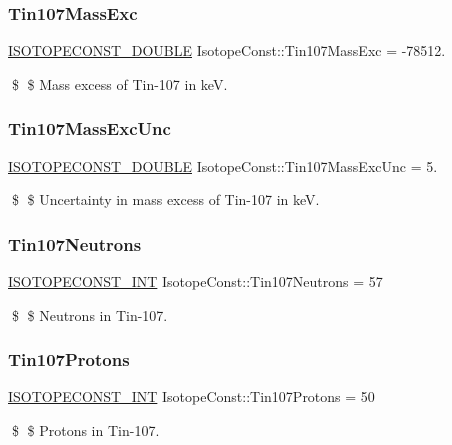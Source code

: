 \subsubsection{\texorpdfstring{Tin107\+Mass\+Exc}{Tin107MassExc}}
{\footnotesize\ttfamily \mbox{\hyperlink{group___isotope_const-_macros_ga8f45a7272ce02c0b4c65c44636ed719a}{I\+S\+O\+T\+O\+P\+E\+C\+O\+N\+S\+T\+\_\+\+D\+O\+U\+B\+LE}} Isotope\+Const\+::\+Tin107\+Mass\+Exc = -\/78512.}

\$ \$ Mass excess of Tin-\/107 in keV. \mbox{\label{group___isotope_const-_tin-_sn107_gac07a70139d8d4c63b59efaa94c54064f}} 
\subsubsection{\texorpdfstring{Tin107\+Mass\+Exc\+Unc}{Tin107MassExcUnc}}
{\footnotesize\ttfamily \mbox{\hyperlink{group___isotope_const-_macros_ga8f45a7272ce02c0b4c65c44636ed719a}{I\+S\+O\+T\+O\+P\+E\+C\+O\+N\+S\+T\+\_\+\+D\+O\+U\+B\+LE}} Isotope\+Const\+::\+Tin107\+Mass\+Exc\+Unc = 5.}

\$ \$ Uncertainty in mass excess of Tin-\/107 in keV. \mbox{\label{group___isotope_const-_tin-_sn107_gab466beefb624da1df0fbb3c6efcacd7e}} 
\subsubsection{\texorpdfstring{Tin107\+Neutrons}{Tin107Neutrons}}
{\footnotesize\ttfamily \mbox{\hyperlink{group___isotope_const-_macros_ga5f18360b3e99483a35c32d789e62621c}{I\+S\+O\+T\+O\+P\+E\+C\+O\+N\+S\+T\+\_\+\+I\+NT}} Isotope\+Const\+::\+Tin107\+Neutrons = 57}

\$ \$ Neutrons in Tin-\/107. \mbox{\label{group___isotope_const-_tin-_sn107_ga5e86fb7b47fc6566acba588b3c5f9159}} 
\subsubsection{\texorpdfstring{Tin107\+Protons}{Tin107Protons}}
{\footnotesize\ttfamily \mbox{\hyperlink{group___isotope_const-_macros_ga5f18360b3e99483a35c32d789e62621c}{I\+S\+O\+T\+O\+P\+E\+C\+O\+N\+S\+T\+\_\+\+I\+NT}} Isotope\+Const\+::\+Tin107\+Protons = 50}

\$ \$ Protons in Tin-\/107. 